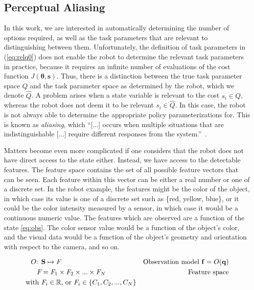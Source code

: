 \documentclass[12pt]{article}
\newcommand{\mymath}[1]{\ensuremath{#1}\xspace}
\newcommand{\sta}    {\mymath{\mathbf{s}}}
\newcommand{\stasp}  {\mymath{\mathbf{S}}}
\newcommand{\app}    {\mymath{\bm{\theta}}}
\newcommand{\taskp}  {\mymath{\mathbf{q}}}
\newcommand{\taskpsp}{\mymath{Q}}
\newcommand{\feat}   {\mymath{f}}
\newcommand{\featv}  {\mymath{\mathbf{f}}}
\newcommand{\featsp} {\mymath{\emph{F}}}
\newcommand{\obsm}   {\mymath{O}}
\begin{document}
\subsection{Perceptual Aliasing}

In this work, we are interested in automatically determining the number of options required, as well as the task parameters that are relevant to distinguishing between them. Unfortunately, the definition of task parameters in (\ref{eq:relq0}) does not enable the robot to determine the relevant task parameters in practice, because it requires an infinite number of evaluations of the cost function $J(\app,\sta)$. 
Thus, there is a distinction between the true task parameter space \taskpsp and the task parameter space as determined by the robot, which we denote $\hat{\taskpsp}$.
A problem arises when a state variable is relevant to the cost $s_i \in \taskpsp$, whereas the robot does not deem it to be relevant $s_i \in \hat{\taskpsp}$. In this case, the robot is not always able to determine the appropriate policy parameterizations for. This is known as \emph{aliasing}, which 
``[$\dots$] occurs when multiple situations that are indistinguishable [$\dots$] require different responses from the system.''~\cite{chrisman92reinforcement}.

Matters become even more complicated if one considers that the robot does not have direct access to the state either. Instead, we have access to the detectable features.  The feature space contains the set of all possible feature vectors that can be seen. Each feature within this vector can be either a real number or one of a discrete set. In the robot example, the features might be the color of the object, in which case its value is one of a discrete set such as \{red, yellow, blue\}, or it could be the color intensity measured by a sensor, in which case it would be a continuous numeric value. The features which are observed are a function of the state \eqref{eq:obs}. The color sensor value would be a function of the object's color, and the visual data would be a function of the object's geometry and orientation with respect to the camera, and so on.

\begin{align}
\obsm\mbox{: } &\label{eq:obs}\stasp \mapsto \featsp& \mbox{Observation model~} \featv=\obsm(\taskp)\\
\featsp &= \featsp_1 \times \featsp_2 \times ... \times \featsp_N & \mbox{Feature space}\\
\mbox{with~} &\featsp_i \in \mathbb{R}\mbox{, or~} \featsp_i \in \{C_1,C_2,...,C_N\}&\notag%
\end{align}
\end{document}
